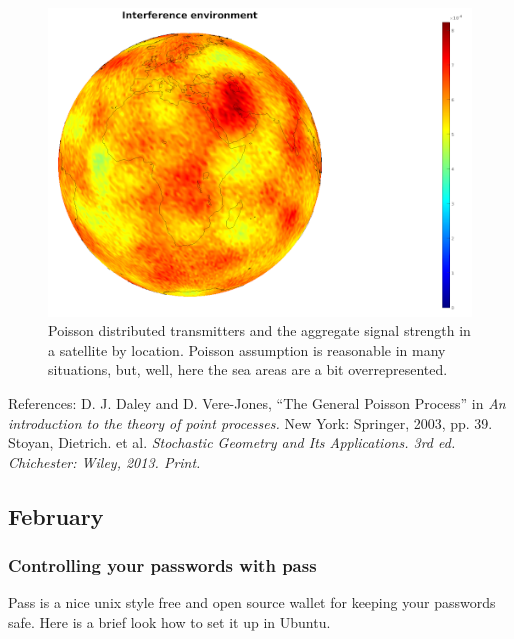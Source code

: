 \documentclass{article}
\begin{document}
\begin{figure}
  \includegraphics[width=\linewidth]{interferenceenvironment.png}
  \caption{Poisson distributed transmitters and the aggregate signal strength in a satellite by location. Poisson assumption is reasonable in many situations, but, well, here the sea areas are a bit overrepresented.  }
\end{figure}

References:
 D. J. Daley and D. Vere-Jones, ``The General Poisson Process'' in {\em An introduction to the theory of point processes.} New York: Springer, 2003, pp. 39. 
 Stoyan, Dietrich. et al. \em{Stochastic Geometry and Its Applications}. 3rd ed. Chichester: Wiley, 2013. Print.




\subsection{February}
\subsubsection{Controlling your passwords with pass}
Pass is a nice unix style free and open source wallet for keeping your passwords safe. Here is a brief look how to set it up in Ubuntu.
\end{document}

